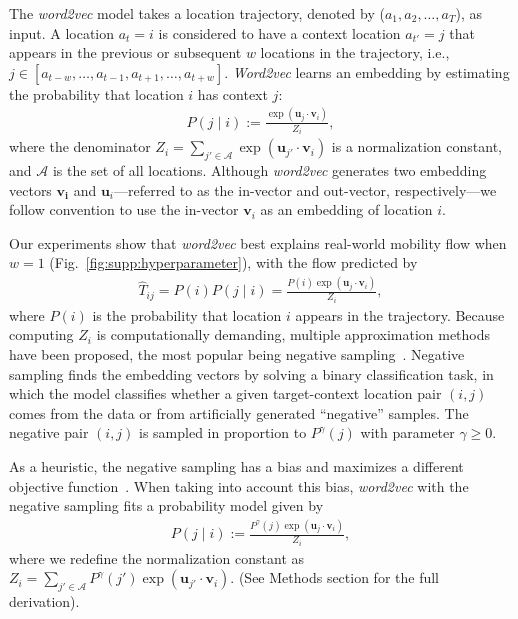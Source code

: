 \documentclass[12pt]{article} %
\def\given{\mid}
\def\ie{i.e.,~}
\begin{document}
The {\it word2vec} model takes a location trajectory, denoted by ($a_{1}, a_{2}, \ldots, a_{T}$), as input.
A location $a_t=i$ is considered to have a context location $a_{t'}=j$ that appears in the previous or subsequent $w$ locations in the trajectory, \ie  $j \in [a_{t-w}, \ldots, a_{t-1}, a_{t+1},\ldots, a_{t+w}]$.
	{\it Word2vec} learns an embedding by estimating the probability that location $i$ has context $j$:
\begin{align}
	P\left(j \given i \right):= \frac{\exp(\bm{u}_j \cdot \bm{v}_{i})}{Z_i}, \label{eq:prob_w2v_ng}
\end{align}
where the denominator $Z_i=\sum_{j' \in \mathcal{A}} \exp(\bm{u}_{j'} \cdot \bm{v}_{i})$ is a normalization constant, and $\mathcal{A}$ is the set of all locations.
Although {\it word2vec} generates two embedding vectors $\bm{v_i}$ and $\bm{u}_i$---referred to as the in-vector and out-vector, respectively---we follow convention to use the in-vector $\bm{v}_i$ as an embedding of location $i$.

Our experiments show that {\it word2vec} best explains real-world mobility flow when $w=1$ (Fig.~\ref{fig:supp:hyperparameter}), with the flow predicted by
\begin{align}
	\label{eq:flow_w2v}
	\hat{T}_{ij} = P(i) P(j\given i) = \frac{P(i)\exp(\bm{u}_j \cdot \bm{v}_{i})}{Z_i},
\end{align}
where $P(i)$ is the probability that location $i$ appears in the trajectory.
Because computing $Z_i$ is computationally demanding, multiple approximation methods have been proposed, the most popular being negative sampling~\autocite{mikolov2013word2vec}.
Negative sampling finds the embedding vectors by solving a binary classification task, in which the model classifies whether a given target-context location pair $(i, j)$ comes from the data or from artificially generated ``negative'' samples.
The negative pair $(i,j)$ is sampled in proportion to $P^\gamma(j)$ with parameter $\gamma \geq 0$.

As a heuristic, the negative sampling has a bias and maximizes a different objective function~\autocite{Gutmann2010}.
When taking into account this bias, {\it word2vec} with the negative sampling fits a probability model given by
\begin{align}
	P\left(j \given i \right):= \frac{P^ \gamma(j) \exp(\bm{u}_j \cdot \bm{v}_{i})}{Z_i}, \label{eq:prob_w2v_ng0}
\end{align}
where we redefine the normalization constant as $Z_i=\sum_{j' \in \mathcal{A}} P^ \gamma (j') \exp(\bm{u}_{j'} \cdot \bm{v}_{i})$. (See Methods section for the full derivation).
\end{document}
